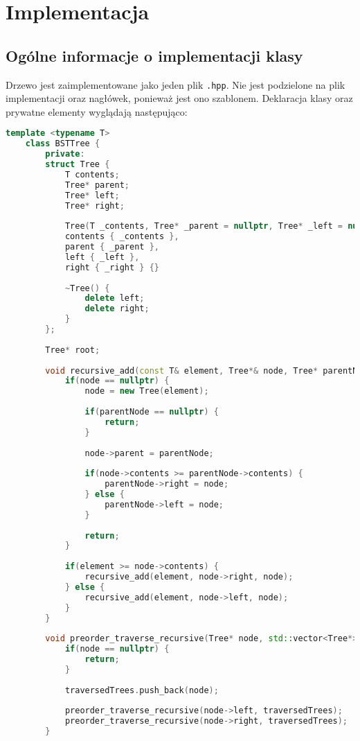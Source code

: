 	\newpage
\section{Implementacja}		%

\subsection{Ogólne informacje o implementacji klasy}

Drzewo jest zaimplementowane jako jeden plik \texttt{.hpp}. Nie jest podzielone na plik implementacji oraz nagłówek, ponieważ jest ono szablonem. Deklaracja klasy oraz prywatne elementy wyglądają następująco:

\begin{lstlisting}[caption=Deklaracja drzewa BST, label={lst:BSTprivate}, language=C++]
	template <typename T>
	class BSTTree {
		private:
		struct Tree {
			T contents;
			Tree* parent;
			Tree* left;
			Tree* right;
			
			Tree(T _contents, Tree* _parent = nullptr, Tree* _left = nullptr, Tree* _right = nullptr):
			contents { _contents },
			parent { _parent },
			left { _left },
			right { _right } {}
			
			~Tree() {
				delete left;
				delete right;
			}
		};
		
		Tree* root;
		
		void recursive_add(const T& element, Tree*& node, Tree* parentNode = nullptr) {
			if(node == nullptr) {
				node = new Tree(element);
				
				if(parentNode == nullptr) {
					return;
				}
				
				node->parent = parentNode;
				
				if(node->contents >= parentNode->contents) {
					parentNode->right = node;
				} else {
					parentNode->left = node;
				}
				
				return;
			}
			
			if(element >= node->contents) {
				recursive_add(element, node->right, node);
			} else {
				recursive_add(element, node->left, node);
			}	
		}
		
		void preorder_traverse_recursive(Tree* node, std::vector<Tree*>& traversedTrees) {
			if(node == nullptr) {
				return;
			}
			
			traversedTrees.push_back(node);
			
			preorder_traverse_recursive(node->left, traversedTrees);
			preorder_traverse_recursive(node->right, traversedTrees);
		}
		

\end{lstlisting}
